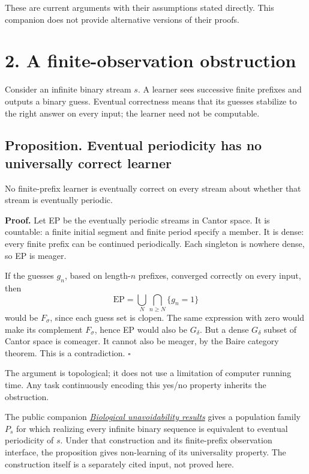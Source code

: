 \documentclass[
  11pt,
  letterpaper,
]{article}
\begin{document}
These are current arguments with their assumptions stated directly. This
companion does not provide alternative versions of their proofs.

\section{2. A finite-observation
obstruction}\label{a-finite-observation-obstruction}

Consider an infinite binary stream \(s\). A learner sees successive
finite prefixes and outputs a binary guess. Eventual correctness means
that its guesses stabilize to the right answer on every input; the
learner need not be computable.

\subsection{Proposition. Eventual periodicity has no universally correct
learner}\label{proposition.-eventual-periodicity-has-no-universally-correct-learner}

No finite-prefix learner is eventually correct on every stream about
whether that stream is eventually periodic.

\textbf{Proof.} Let EP be the eventually periodic streams in Cantor
space. It is countable: a finite initial segment and finite period
specify a member. It is dense: every finite prefix can be continued
periodically. Each singleton is nowhere dense, so EP is meager.

If the guesses \(g_n\), based on length-\(n\) prefixes, converged
correctly on every input, then \[
                     \mathrm{EP}
                        =\bigcup_N\bigcap_{n\geq N}\{g_n=1\}
\] would be \(F_\sigma\), since each guess set is clopen. The same
expression with zero would make its complement \(F_\sigma\), hence EP
would also be \(G_\delta\). But a dense \(G_\delta\) subset of Cantor
space is comeager. It cannot also be meager, by the Baire category
theorem. This is a contradiction. \hfill\(\square\)

The argument is topological; it does not use a limitation of computer
running time. Any task continuously encoding this yes/no property
inherits the obstruction.

The public companion
\href{https://github.com/avg-netizen/biological-unavoidability-results}{\emph{Biological
unavoidability results}} gives a population family \(P_s\) for which
realizing every infinite binary sequence is equivalent to eventual
periodicity of \(s\). Under that construction and its finite-prefix
observation interface, the proposition gives non-learning of its
universality property. The construction itself is a separately cited
input, not proved here.
\end{document}
